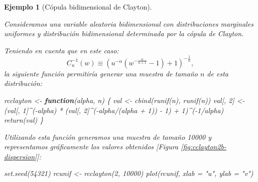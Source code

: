 \documentclass[
]{book}
\newenvironment{Shaded}{\begin{snugshade}}{\end{snugshade}}
\newcommand{\AttributeTok}[1]{\textcolor[rgb]{0.77,0.63,0.00}{#1}}
\newcommand{\ControlFlowTok}[1]{\textcolor[rgb]{0.13,0.29,0.53}{\textbf{#1}}}
\newcommand{\DecValTok}[1]{\textcolor[rgb]{0.00,0.00,0.81}{#1}}
\newcommand{\FunctionTok}[1]{\textcolor[rgb]{0.00,0.00,0.00}{#1}}
\newcommand{\NormalTok}[1]{#1}
\newcommand{\OtherTok}[1]{\textcolor[rgb]{0.56,0.35,0.01}{#1}}
\newcommand{\SpecialCharTok}[1]{\textcolor[rgb]{0.00,0.00,0.00}{#1}}
\newcommand{\StringTok}[1]{\textcolor[rgb]{0.31,0.60,0.02}{#1}}
\theoremstyle{break}
\newtheorem{example}{Ejemplo}[chapter]
\theoremstyle{nonumberplain}
\begin{document}
\begin{example}[Cópula bidimensional de Clayton]
\protect\hypertarget{exm:clayton2d}{}\label{exm:clayton2d}

Consideramos una variable aleatoria bidimensional con distribuciones marginales uniformes y distribución bidimensional determinada por la cópula de Clayton.

Teniendo en cuenta que en este caso:
\[C_{u}^{-1}(w)\equiv\left(  u^{-\alpha}\left(  
w^{-\frac{\alpha}{\alpha+1}}-1\right) + 1 \right)^{-\frac{1}{\alpha}},\]
la siguiente función permitiría generar una muestra de tamaño \(n\) de esta distribución:

\begin{Shaded}
\begin{Highlighting}[]
\NormalTok{rcclayton }\OtherTok{\textless{}{-}} \ControlFlowTok{function}\NormalTok{(alpha, n) \{}
\NormalTok{  val }\OtherTok{\textless{}{-}} \FunctionTok{cbind}\NormalTok{(}\FunctionTok{runif}\NormalTok{(n), }\FunctionTok{runif}\NormalTok{(n))}
\NormalTok{  val[, }\DecValTok{2}\NormalTok{] }\OtherTok{\textless{}{-}}\NormalTok{ (val[, }\DecValTok{1}\NormalTok{]}\SpecialCharTok{\^{}}\NormalTok{(}\SpecialCharTok{{-}}\NormalTok{alpha) }\SpecialCharTok{*} 
\NormalTok{              (val[, }\DecValTok{2}\NormalTok{]}\SpecialCharTok{\^{}}\NormalTok{(}\SpecialCharTok{{-}}\NormalTok{alpha}\SpecialCharTok{/}\NormalTok{(alpha }\SpecialCharTok{+} \DecValTok{1}\NormalTok{)) }\SpecialCharTok{{-}} \DecValTok{1}\NormalTok{) }\SpecialCharTok{+} \DecValTok{1}\NormalTok{)}\SpecialCharTok{\^{}}\NormalTok{(}\SpecialCharTok{{-}}\DecValTok{1}\SpecialCharTok{/}\NormalTok{alpha)}
  \FunctionTok{return}\NormalTok{(val)}
\NormalTok{\}}
\end{Highlighting}
\end{Shaded}

Utilizando esta función generamos una muestra de tamaño 10000 y representamos gráficamente los valores obtenidos {[}Figura \ref{fig:cclayton2b-dispersion}{]}:

\begin{Shaded}
\begin{Highlighting}[]
\FunctionTok{set.seed}\NormalTok{(}\DecValTok{54321}\NormalTok{)}
\NormalTok{rcunif }\OtherTok{\textless{}{-}} \FunctionTok{rcclayton}\NormalTok{(}\DecValTok{2}\NormalTok{, }\DecValTok{10000}\NormalTok{)}
\FunctionTok{plot}\NormalTok{(rcunif, }\AttributeTok{xlab =} \StringTok{"u"}\NormalTok{, }\AttributeTok{ylab =} \StringTok{"v"}\NormalTok{)}
\end{Highlighting}
\end{Shaded}


\end{example}
\end{document}
